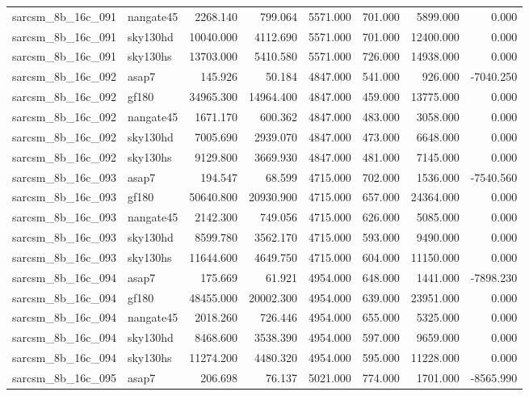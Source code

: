 \begin{tabular}{llrrrrrr}
sarcsm\_8b\_16c\_091 & nangate45 & 2268.140 & 799.064 & 5571.000 & 701.000 & 5899.000 & 0.000 \\
sarcsm\_8b\_16c\_091 & sky130hd & 10040.000 & 4112.690 & 5571.000 & 701.000 & 12400.000 & 0.000 \\
sarcsm\_8b\_16c\_091 & sky130hs & 13703.000 & 5410.580 & 5571.000 & 726.000 & 14938.000 & 0.000 \\
sarcsm\_8b\_16c\_092 & asap7 & 145.926 & 50.184 & 4847.000 & 541.000 & 926.000 & -7040.250 \\
sarcsm\_8b\_16c\_092 & gf180 & 34965.300 & 14964.400 & 4847.000 & 459.000 & 13775.000 & 0.000 \\
sarcsm\_8b\_16c\_092 & nangate45 & 1671.170 & 600.362 & 4847.000 & 483.000 & 3058.000 & 0.000 \\
sarcsm\_8b\_16c\_092 & sky130hd & 7005.690 & 2939.070 & 4847.000 & 473.000 & 6648.000 & 0.000 \\
sarcsm\_8b\_16c\_092 & sky130hs & 9129.800 & 3669.930 & 4847.000 & 481.000 & 7145.000 & 0.000 \\
sarcsm\_8b\_16c\_093 & asap7 & 194.547 & 68.599 & 4715.000 & 702.000 & 1536.000 & -7540.560 \\
sarcsm\_8b\_16c\_093 & gf180 & 50640.800 & 20930.900 & 4715.000 & 657.000 & 24364.000 & 0.000 \\
sarcsm\_8b\_16c\_093 & nangate45 & 2142.300 & 749.056 & 4715.000 & 626.000 & 5085.000 & 0.000 \\
sarcsm\_8b\_16c\_093 & sky130hd & 8599.780 & 3562.170 & 4715.000 & 593.000 & 9490.000 & 0.000 \\
sarcsm\_8b\_16c\_093 & sky130hs & 11644.600 & 4649.750 & 4715.000 & 604.000 & 11150.000 & 0.000 \\
sarcsm\_8b\_16c\_094 & asap7 & 175.669 & 61.921 & 4954.000 & 648.000 & 1441.000 & -7898.230 \\
sarcsm\_8b\_16c\_094 & gf180 & 48455.000 & 20002.300 & 4954.000 & 639.000 & 23951.000 & 0.000 \\
sarcsm\_8b\_16c\_094 & nangate45 & 2018.260 & 726.446 & 4954.000 & 655.000 & 5325.000 & 0.000 \\
sarcsm\_8b\_16c\_094 & sky130hd & 8468.600 & 3538.390 & 4954.000 & 597.000 & 9659.000 & 0.000 \\
sarcsm\_8b\_16c\_094 & sky130hs & 11274.200 & 4480.320 & 4954.000 & 595.000 & 11228.000 & 0.000 \\
sarcsm\_8b\_16c\_095 & asap7 & 206.698 & 76.137 & 5021.000 & 774.000 & 1701.000 & -8565.990 \\

\end{tabular}
